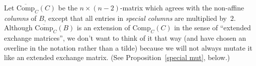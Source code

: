 \documentclass{amsart}
\newtheorem{proposition}{Proposition}[section]
\theoremstyle{definition}
\theoremstyle{remark}
\numberwithin{equation}{section}
\newcommand{\0}{{\mathbf{0}}}
\newcommand{\Comp}{\mathrm{Comp}_C}
\newcommand{\CompPlus}{\overline{\mathrm{Comp}}_C}
\newcommand{\margincolor}{red}
\newcommand{\marginauthorcolor}{darkgreen}
\newcounter{margincounter}
\newcommand{\marginnum}{
\ifnum\value{margincounter}<10
\textcolor{\margincolor}{\begin{picture}(0,0)\put(2.2,2.4){\circle{9}}\end{picture}\footnotesize\arabic{margincounter}}
\else\ifnum\value{margincounter}<100
\textcolor{\margincolor}{\begin{picture}(0,0)\put(4.256,2.5){\circle{11}}\end{picture}\footnotesize\arabic{margincounter}}
\else
\textcolor{\margincolor}{\begin{picture}(0,0)\put(6.8,2.5){\circle{14}}\end{picture}\footnotesize\arabic{margincounter}}
\fi\fi
}
\newcommand{\margin}[2][]
{\!\!\refstepcounter{margincounter}\marginnum\marginpar{\textcolor{\margincolor}{\arabic{margincounter}.}\,\,\textcolor{\marginauthorcolor}{\small#1:}\,\,\tiny #2}}
\newcommand{\saySS}[1]{\margin[S]{#1}}
\begin{document}
Let $\CompPlus(C)$ be the $n\times(n-2)$-matrix which agrees with the non-affine \emph{columns} of $B$, except that all entries in \emph{special columns} are multiplied by~$2$.
Although $\CompPlus(B)$ is an extension of $\Comp(C)$ in the sense of ``extended exchange matrices'', we don't want to think of it that way (and have chosen an overline in the notation rather than a tilde) because we will not always mutate it like an extended exchange matrix.
(See Proposition~\ref{special mut}, below.)

\end{document}
